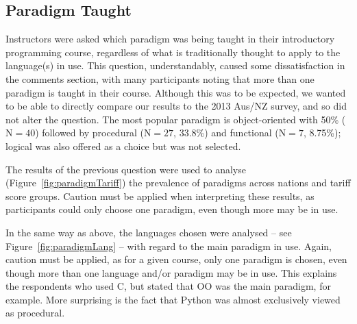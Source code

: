 \documentclass[english,submission]{programming}
\begin{document}
\subsection{Paradigm Taught}

Instructors were asked which paradigm was being taught in their
introductory programming course, regardless of what is traditionally
thought to apply to the language(s) in use. This question,
understandably, caused some dissatisfaction in the comments section,
with many participants noting that more than one paradigm is taught in
their course. Although this was to be expected, we wanted to be able
to directly compare our results to the 2013 Aus/NZ survey, and so did
not alter the question. The most popular paradigm is object-oriented
with 50\% ($\mathrm{N}=40$) followed by procedural ($\mathrm{N}=27$,
33.8\%) and functional ($\mathrm{N}=7$, 8.75\%); logical was also
offered as a choice but was not selected.

The results of the previous question were used to analyse
(Figure~\ref{fig:paradigmTariff}) the prevalence of paradigms across
nations and tariff score groups. Caution must be applied when
interpreting these results, as participants could only choose one
paradigm, even though more may be in use.


In the same way as above, the languages chosen were analysed -- see
Figure~\ref{fig:paradigmLang} -- with regard to the main paradigm in
use. Again, caution must be applied, as for a given course, only one
paradigm is chosen, even though more than one language and/or paradigm
may be in use. This explains the respondents who used C, but stated
that OO was the main paradigm, for example. More surprising is the
fact that Python was almost exclusively viewed as procedural.


%
\end{document}
